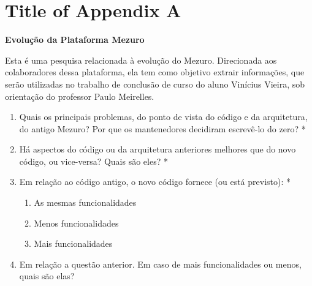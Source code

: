 \newpage
\appendix
\section{Title of Appendix A} 
\label{form-pesquisa}

\textbf{{\large Evolução da Plataforma Mezuro}}

\begin{mdframed}
Esta é uma pesquisa relacionada à evolução do Mezuro. Direcionada aos colaboradores dessa plataforma, ela tem como objetivo extrair informações, que serão utilizadas no trabalho de conclusão de curso do aluno Vinícius Vieira, sob orientação do professor Paulo Meirelles.
\end{mdframed}

\begin{enumerate}
\item Quais os principais problemas, do ponto de vista do código e da arquitetura, do antigo Mezuro? Por que os mantenedores decidiram escrevê-lo do zero? *
\item Há aspectos do código ou da arquitetura anteriores melhores que do novo código, ou vice-versa? Quais são eles? *
\item Em relação ao código antigo, o novo código fornece (ou está previsto): *
  \begin{enumerate}
  \item As mesmas funcionalidades
  \item Menos funcionalidades
  \item Mais funcionalidades 
  \end{enumerate}
\item Em relação a questão anterior. Em caso de mais funcionalidades ou menos, quais são elas? 
\end{enumerate}